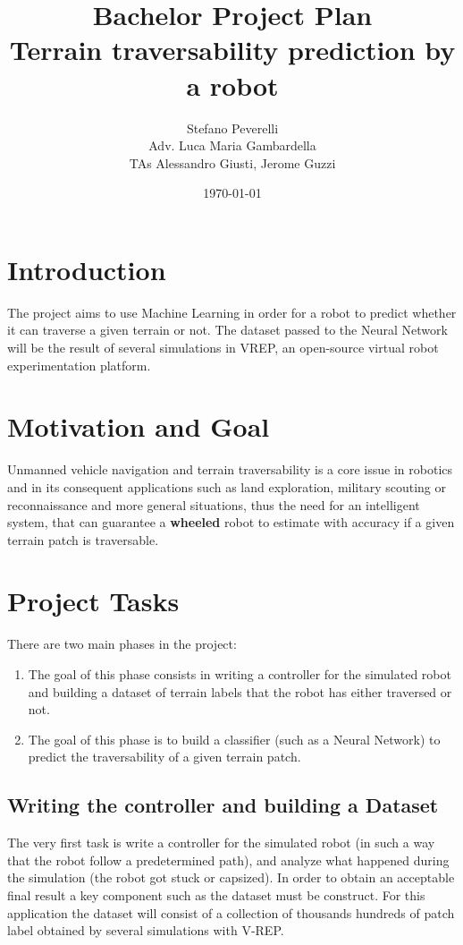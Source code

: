 \documentclass{article}[14pt]
\begin{document}
\title{Bachelor Project Plan \\ Terrain traversability prediction by a robot}
\author{Stefano Peverelli \\ Adv. Luca Maria Gambardella \\ TAs Alessandro Giusti, Jerome Guzzi}
\date{\today}
\maketitle
\section*{Introduction}
The project aims to use Machine Learning in order for a robot to predict whether it can traverse a given terrain or not. 
The dataset passed to the Neural Network will be the result of several simulations in VREP, an open-source virtual robot experimentation platform.
\section*{Motivation and Goal}
Unmanned vehicle navigation and terrain traversability is a core issue in robotics and in its consequent applications such as 
land exploration, military scouting or reconnaissance  and more general situations, thus the need for an intelligent system,
that can guarantee a \textbf{wheeled} robot to estimate with accuracy if a given terrain patch is traversable.
\section*{Project Tasks}
There are two main phases in the project: 
\begin{enumerate}
\item
    The goal of this phase consists in writing a controller for the simulated robot and building a dataset
    of terrain labels that the robot has either traversed or not.
\item
    The goal of this phase is to build a classifier (such as a Neural Network) to predict the traversability of a given terrain patch.
\end{enumerate}
\subsection*{Writing the controller and building a Dataset}
The very first task is write a controller for the simulated robot (in such a way that the robot follow a predetermined path), and analyze what happened
during the simulation (the robot got stuck or capsized).
In order to obtain an acceptable final result a key component such as the dataset must be construct. For this application
the dataset will consist of a collection of thousands hundreds of patch label obtained by several simulations with V-REP. 
\end{document}
